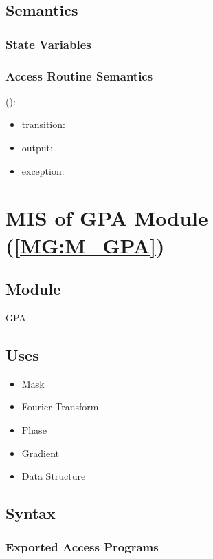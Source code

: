\documentclass[12pt, titlepage]{article}
\begin{document}
\subsection{Semantics}

\subsubsection{State Variables}


\subsubsection{Access Routine Semantics}

\noindent {}():
\begin{itemize}
\item transition:  
\item output:  
\item exception:  
\end{itemize}

\section{MIS of GPA Module (\texorpdfstring{\cref{MG:M_GPA}}))} \label{MIS_GPA}

\subsection{Module}
GPA
\subsection{Uses}
\begin{itemize}
\item Mask
\item Fourier Transform
\item Phase
\item Gradient
\item Data Structure
\end{itemize}

\subsection{Syntax}

\subsubsection{Exported Access Programs}
\end{document}
